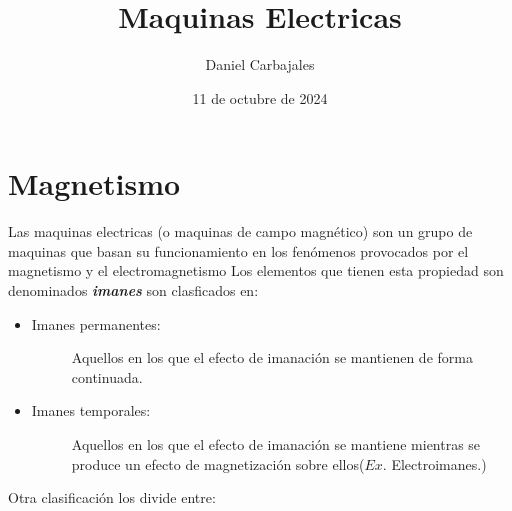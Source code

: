 \documentclass{report}
\title{\Huge{Maquinas Electricas}} \author{\large{Daniel Carbajales}}
\date{11 de octubre de 2024}
\begin{document}
 \maketitle
 \newpage

 \tableofcontents
 
\label{chap:1}
  \section{Magnetismo }\label{sec:magnetismo}

 Las maquinas electricas (o maquinas de campo magnético) son un grupo de maquinas que basan su funcionamiento
 en los fenómenos provocados por el magnetismo y el electromagnetismo 
 Los elementos que tienen esta propiedad son denominados \textbf\emph{imanes} son clasficados en:
 \begin{itemize}
   \item\begin{description}
       \item[Imanes permanentes:] Aquellos en los que el efecto de imanación se mantienen de forma continuada.
    \end{description}
  \item\begin{description}
      \item[Imanes temporales:] Aquellos en los que el efecto de imanación se mantiene mientras se produce un efecto de magnetización sobre ellos(\(Ex.\) Electroimanes.)
      \end{description}
 \end{itemize}
 Otra clasificación los divide entre:
\end{document}
